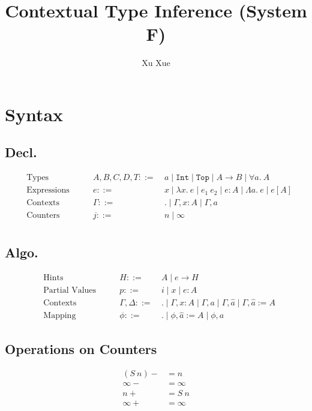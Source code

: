 \documentclass{article}
\title{Contextual Type Inference (System F)}
\author{Xu Xue}
\begin{document}
\maketitle

\section{Syntax}

\subsection{Decl.}

\begin{align*}
&\text{Types} \quad\quad &A, B, C, D, T ::=&~ a \mid \mathtt{Int} \mid \mathtt{Top} \mid A \rightarrow B \mid \forall a.~A\\
&\text{Expressions} \quad \quad &e::=&~ x \mid \lambda x . ~e \mid e_1~e_2 \mid e : A \mid \Lambda a.~e \mid e[A]\\
&\text{Contexts} \quad\quad &\Gamma::=&~ . \mid \Gamma, x : A \mid \Gamma, a\\
&\text{Counters} \quad\quad &j ::=&~ n \mid \infty\\
\end{align*}

\subsection{Algo.}

\begin{align*}
    &\text{Hints} \quad\quad &H ::=&~ A \mid \boxed{e} \rightarrow H\\
    &\text{Partial Values} \quad \quad &p::=&~ i \mid x \mid e : A\\
    &\text{Contexts} \quad\quad &\Gamma,\Delta::=&~ . \mid \Gamma, x : A \mid \Gamma, a \mid \Gamma, \hat{a} \mid \Gamma, \hat{a}:=A\\
    &\text{Mapping}\quad\quad &\phi ::=&~. \mid \phi, \hat{a}:=A \mid \phi, a
\end{align*}



\subsection{Operations on Counters}

\begin{align*}
    (S~n)- &= n \\
    \infty - &= \infty \\
    n+ &= S~n \\
    \infty + &= \infty
\end{align*}
\end{document}
